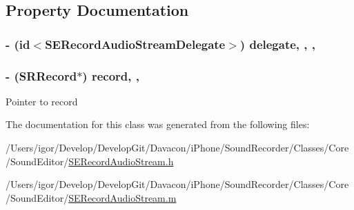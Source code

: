 \subsection{Property Documentation}
\hypertarget{interface_s_e_record_audio_stream_a63ed0771101a0265b303e0ae90a4258a}{
\subsubsection[{delegate}]{\setlength{\rightskip}{0pt plus 5cm}-\/ (id$<${\bf S\-E\-Record\-Audio\-Stream\-Delegate}$>$) delegate\hspace{0.3cm}{\ttfamily [read]}, {\ttfamily [write]}, {\ttfamily [nonatomic]}, {\ttfamily [weak]}}}\label{interface_s_e_record_audio_stream_a63ed0771101a0265b303e0ae90a4258a}
\hypertarget{interface_s_e_record_audio_stream_a7f9b00906c871fef706dd86b29044185}{
\subsubsection[{record}]{\setlength{\rightskip}{0pt plus 5cm}-\/ (S\-R\-Record$\ast$) record\hspace{0.3cm}{\ttfamily [read]}, {\ttfamily [nonatomic]}, {\ttfamily [assign]}}}\label{interface_s_e_record_audio_stream_a7f9b00906c871fef706dd86b29044185}
Pointer to record 

The documentation for this class was generated from the following files\-:\begin{DoxyCompactItemize}
\item 
/\-Users/igor/\-Develop/\-Develop\-Git/\-Davacon/i\-Phone/\-Sound\-Recorder/\-Classes/\-Core/\-Sound\-Editor/\hyperlink{_s_e_record_audio_stream_8h}{S\-E\-Record\-Audio\-Stream.\-h}\item 
/\-Users/igor/\-Develop/\-Develop\-Git/\-Davacon/i\-Phone/\-Sound\-Recorder/\-Classes/\-Core/\-Sound\-Editor/\hyperlink{_s_e_record_audio_stream_8m}{S\-E\-Record\-Audio\-Stream.\-m}\end{DoxyCompactItemize}
